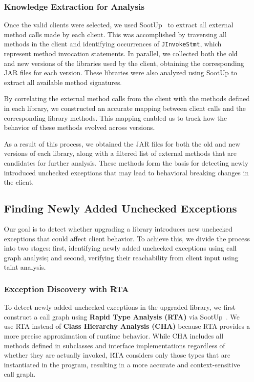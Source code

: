 \subsubsection{Knowledge Extraction for Analysis}

Once the valid clients were selected, we used SootUp~\cite{Karakaya24:_sootup} to extract all external method calls made by each client. This was accomplished by traversing all methods in the client and identifying occurrences of \texttt{JInvokeStmt}, which represent method invocation statements. In parallel, we collected both the old and new versions of the libraries used by the client, obtaining the corresponding JAR files for each version. These libraries were also analyzed using SootUp to extract all available method signatures.

By correlating the external method calls from the client with the methods defined in each library, we constructed an accurate mapping between client calls and the corresponding library methods. This mapping enabled us to track how the behavior of these methods evolved across versions.

As a result of this process, we obtained the JAR files for both the old and new versions of each library, along with a filtered list of external methods that are candidates for further analysis. These methods form the basis for detecting newly introduced unchecked exceptions that may lead to behavioral breaking changes in the client.

\subsection{Finding Newly Added Unchecked Exceptions}

Our goal is to detect whether upgrading a library introduces new unchecked exceptions that could affect client behavior. To achieve this, we divide the process into two stages: first, identifying newly added unchecked exceptions using call graph analysis; and second, verifying their reachability from client input using taint analysis.

\subsubsection{Exception Discovery with RTA}

To detect newly added unchecked exceptions in the upgraded library, we first construct a call graph using \textbf{Rapid Type Analysis (RTA)} via SootUp~\cite{Karakaya24:_sootup}. We use RTA instead of \textbf{Class Hierarchy Analysis (CHA)} because RTA provides a more precise approximation of runtime behavior. While CHA includes all methods defined in subclasses and interface implementations regardless of whether they are actually invoked, RTA considers only those types that are instantiated in the program, resulting in a more accurate and context-sensitive call graph.

